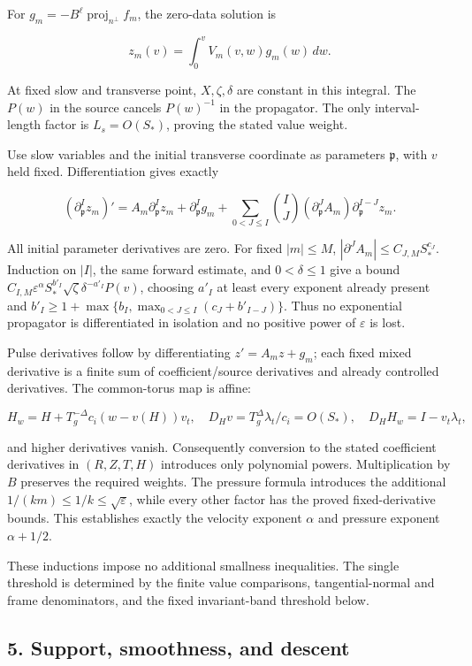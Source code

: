 \documentclass[10pt,a4paper]{article}
\begin{document}
For \(g_m=-B^\ell\operatorname{proj}_{n^\perp}f_m\), the zero-data solution is

\[
z_m(v)=\int_0^vV_m(v,w)g_m(w)\,dw.
\]

At fixed slow and transverse point, \(X,\zeta,\delta\) are constant in this integral. The \(P(w)\) in the source cancels \(P(w)^{-1}\) in the propagator. The only interval-length factor is \(L_s=O(S_*)\), proving the stated value weight.

Use slow variables and the initial transverse coordinate as parameters \(\mathfrak p\), with \(v\) held fixed. Differentiation gives exactly

\[
(\partial_{\mathfrak p}^Iz_m)'=A_m\partial_{\mathfrak p}^Iz_m+
\partial_{\mathfrak p}^Ig_m+
\sum_{0<J\le I}\binom IJ(\partial_{\mathfrak p}^JA_m)
\partial_{\mathfrak p}^{I-J}z_m.
\]

All initial parameter derivatives are zero. For fixed \(|m|\le M\), \(|\partial^JA_m|\le C_{J,M}S_*^{c_J}\). Induction on \(|I|\), the same forward estimate, and \(0<\delta\le1\) give a bound \(C_{I,M}\varepsilon^\alpha S_*^{b'_I}\sqrt\zeta\delta^{-a'_I}P(v)\), choosing \(a'_I\) at least every exponent already present and \(b'_I\ge1+\max\{b_I,\max_{0<J\le I}(c_J+b'_{I-J})\}\). Thus no exponential propagator is differentiated in isolation and no positive power of \(\varepsilon\) is lost.

Pulse derivatives follow by differentiating \(z'=A_mz+g_m\); each fixed mixed derivative is a finite sum of coefficient/source derivatives and already controlled derivatives. The common-torus map is affine:

\[
H_w=H+T_g^{-\Delta}c_i(w-v(H))v_t,\quad
D_Hv=T_g^\Delta\lambda_t/c_i=O(S_*),\quad
D_HH_w=I-v_t\lambda_t,
\]

and higher derivatives vanish. Consequently conversion to the stated coefficient derivatives in \((R,Z,T,H)\) introduces only polynomial powers. Multiplication by \(B\) preserves the required weights. The pressure formula introduces the additional \(1/(km)\le1/k\le\sqrt\varepsilon\), while every other factor has the proved fixed-derivative bounds. This establishes exactly the velocity exponent \(\alpha\) and pressure exponent \(\alpha+1/2\).

These inductions impose no additional smallness inequalities. The single threshold is determined by the finite value comparisons, tangential-normal and frame denominators, and the fixed invariant-band threshold below.

\subsection{5. Support, smoothness, and descent}\label{gclosure:support-smoothness-and-descent}
\end{document}
